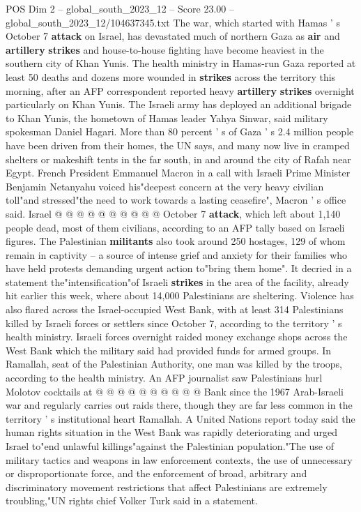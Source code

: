 \begin{textsample}{POS Dim 2 – global\_south\_2023\_12 – Score 23.00 – global\_south\_2023\_12/104637345.txt}  \label{ex:f2_pos_151}
The war, which started with Hamas ' s October 7 \textbf{attack} on Israel, has devastated much of northern Gaza as \textbf{air} and \textbf{artillery} \textbf{strikes} and house-to-house fighting have become heaviest in the southern city of Khan Yunis.
The health ministry in Hamas-run Gaza reported at least 50 deaths and dozens more wounded in \textbf{strikes} across the territory this morning, after an AFP correspondent reported heavy \textbf{artillery} \textbf{strikes} overnight particularly on Khan Yunis.
The Israeli army has deployed an additional brigade to Khan Yunis, the hometown of Hamas leader Yahya Sinwar, said military spokesman Daniel Hagari.
More than 80 percent ' s of Gaza ' s 2.4 million people have been driven from their homes, the UN says, and many now live in cramped shelters or makeshift tents in the far south, in and around the city of Rafah near Egypt.
French President Emmanuel Macron in a call with Israeli Prime Minister Benjamin Netanyahu voiced his"deepest concern at the very heavy civilian toll"and stressed"the need to work towards a lasting ceasefire", Macron ' s office said.
Israel @ @ @ @ @ @ @ @ @ @ October 7 \textbf{attack}, which left about 1,140 people dead, most of them civilians, according to an AFP tally based on Israeli figures.
The Palestinian \textbf{militants} also took around 250 hostages, 129 of whom remain in captivity -- a source of intense grief and anxiety for their families who have held protests demanding urgent action to"bring them home".
It decried in a statement the"intensification"of Israeli \textbf{strikes} in the area of the facility, already hit earlier this week, where about 14,000 Palestinians are sheltering.
Violence has also flared across the Israel-occupied West Bank, with at least 314 Palestinians killed by Israeli forces or settlers since October 7, according to the territory ' s health ministry.
Israeli forces overnight raided money exchange shops across the West Bank which the military said had provided funds for armed groups.
In Ramallah, seat of the Palestinian Authority, one man was killed by the troops, according to the health ministry.
An AFP journalist saw Palestinians hurl Molotov cocktails at @ @ @ @ @ @ @ @ @ @ Bank since the 1967 Arab-Israeli war and regularly carries out raids there, though they are far less common in the territory ' s institutional heart Ramallah.
A United Nations report today said the human rights situation in the West Bank was rapidly deteriorating and urged Israel to"end unlawful killings"against the Palestinian population."The use of military tactics and weapons in law enforcement contexts, the use of unnecessary or disproportionate force, and the enforcement of broad, arbitrary and discriminatory movement restrictions that affect Palestinians are extremely troubling,"UN rights chief Volker Turk said in a statement.

\end{textsample}
